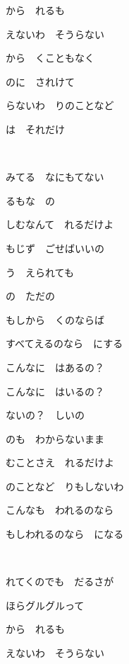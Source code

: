 \documentclass[12pt,a4paper]{article}
\begin{document}
から　れるも

えないわ　そうらない

から　くこともなく

のに　されけて

らないわ　りのことなど

は　それだけ

~

みてる　なにもてない

るもな　の

しむなんて　れるだけよ

もじず　ごせばいいの

う　えられても

の　ただの

もしから　くのならば

すべてえるのなら　にする

こんなに　はあるの？

こんなに　はいるの？

ないの？　しいの

のも　わからないまま

むことさえ　れるだけよ

のことなど　りもしないわ

こんなも　われるのなら

もしわれるのなら　になる

~


れてくのでも　だるさが

ほらグルグルって

から　れるも

えないわ　そうらない
\end{document}
